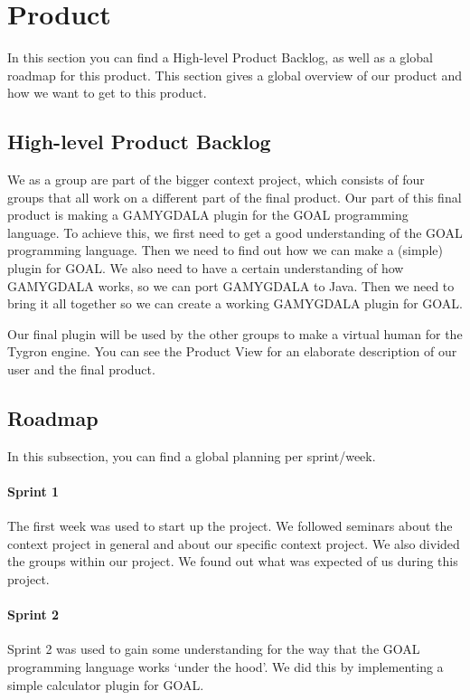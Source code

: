\section{Product}
In this section you can find a High-level Product Backlog, as well as a global roadmap for this product. This section gives a global overview of our product and how we want to get to this product.

\subsection{High-level Product Backlog}
We as a group are part of the bigger context project, which consists of four groups that all work on a different part of the final product. Our part of this final product is making a GAMYGDALA plugin for the GOAL programming language. To achieve this, we first need to get a good understanding of the GOAL programming language. Then we need to find out how we can make a (simple) plugin for GOAL. We also need to have a certain understanding of how GAMYGDALA works, so we can port GAMYGDALA to Java. Then we need to bring it all together so we can create a working GAMYGDALA plugin for GOAL. \\ \par
Our final plugin will be used by the other groups to make a virtual human for the Tygron engine. You can see the Product View for an elaborate description of our user and the final product.

\subsection{Roadmap}
In this subsection, you can find a global planning per sprint/week.

\paragraph{Sprint 1} The first week was used to start up the project. We followed seminars about the context project in general and about our specific context project. We also divided the groups within our project. We found out what was expected of us during this project.
\paragraph{Sprint 2} Sprint 2 was used to gain some understanding for the way that the GOAL programming language works `under the hood'. We did this by implementing a simple calculator plugin for GOAL.
